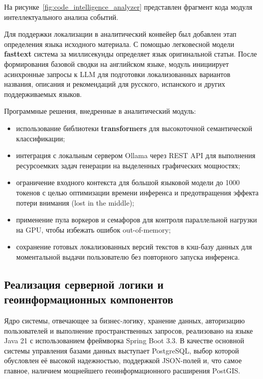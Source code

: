 На рисунке~\ref{fig:code_intelligence_analyzer} представлен фрагмент кода модуля интеллектуального анализа событий.


Для поддержки локализации в аналитический конвейер был добавлен этап определения языка исходного материала. С помощью легковесной модели \textbf{fasttext} система за миллисекунды определяет язык оригинальной статьи. После формирования базовой сводки на английском языке, модуль инициирует асинхронные запросы к LLM для подготовки локализованных вариантов названия, описания и рекомендаций для русского, испанского и других поддерживаемых языков. 

Программные решения, внедренные в аналитический модуль:
\begin{itemize}
    \item использование библиотеки \textbf{transformers} для высокоточной семантической классификации;
    \item интеграция с локальным сервером Ollama через REST API для выполнения ресурсоемких задач генерации на выделенных графических мощностях;
    \item ограничение входного контекста для большой языковой модели до 1000 токенов с целью оптимизации времени инференса и предотвращения эффекта потери внимания (lost in the middle);
    \item применение пула воркеров и семафоров для контроля параллельной нагрузки на GPU, чтобы избежать ошибок out-of-memory;
    \item сохранение готовых локализованных версий текстов в кэш-базу данных для моментальной выдачи пользователю без повторного запуска инференса.
\end{itemize}

\subsection{Реализация серверной логики и геоинформационных компонентов}

Ядро системы, отвечающее за бизнес-логику, хранение данных, авторизацию пользователей и выполнение пространственных запросов, реализовано на языке Java 21 с использованием фреймворка Spring Boot 3.3. В качестве основной системы управления базами данных выступает PostgreSQL, выбор которой обусловлен её высокой надежностью, поддержкой JSON-полей и, что самое главное, наличием мощнейшего геоинформационного расширения PostGIS.

